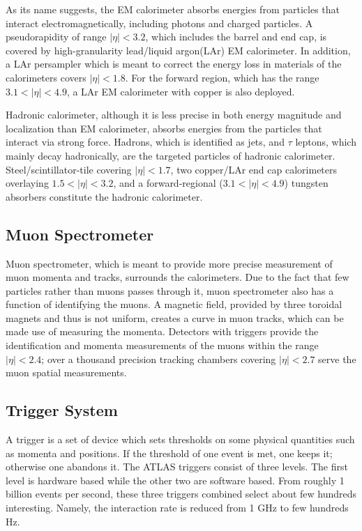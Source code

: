 \documentclass[class=NCU_thesis, crop=false]{standalone}
\begin{document}
		As its name suggests, the EM calorimeter absorbs energies from particles that interact electromagnetically, including photons and charged particles. A pseudorapidity of range $\lvert \eta \rvert < 3.2$, which includes the barrel and end cap, is covered by high-granularity lead/liquid argon(LAr) EM calorimeter. In addition, a LAr persampler which is meant to correct the energy loss in materials of the calorimeters covers $\lvert \eta \rvert < 1.8$. For the forward region, which has the range $3.1 < \lvert \eta \rvert < 4.9$, a LAr EM calorimeter with copper is also deployed.
		
		Hadronic calorimeter, although it is less precise in both energy magnitude and localization than EM calorimeter, absorbs energies from the particles that interact via strong force. Hadrons, which is identified as jets, and $\tau$ leptons, which mainly decay hadronically, are the targeted particles of hadronic calorimeter. Steel/scintillator-tile covering $\lvert \eta \rvert < 1.7$, two copper/LAr end cap calorimeters overlaying $1.5 < \lvert \eta \rvert < 3.2$, and a forward-regional ($3.1 < \lvert \eta \rvert < 4.9$) tungsten absorbers constitute the hadronic calorimeter.
	
	\subsection{Muon Spectrometer}
		Muon spectrometer, which is meant to provide more precise measurement of muon momenta and tracks, surrounds the calorimeters. Due to the fact that few particles rather than muons passes through it, muon spectrometer also has a function of identifying the muons. A magnetic field, provided by three toroidal magnets and thus is not uniform, creates a curve in muon tracks, which can be made use of measuring the momenta. Detectors with triggers provide the identification and momenta measurements of the muons within the range $\lvert \eta \rvert < 2.4$; over a thousand precision tracking chambers covering $\lvert \eta \rvert < 2.7$ serve the muon spatial measurements.
		
	\subsection{Trigger System}
		A trigger is a set of device which sets thresholds on some physical quantities such as momenta and positions. If the threshold of one event is met, one keeps it; otherwise one abandons it. The ATLAS triggers consist of three levels. The first level is hardware based while the other two are software based. From roughly 1 billion events per second, these three triggers combined select about few hundreds interesting. Namely, the interaction rate is reduced from 1 GHz to few hundreds Hz.
		
\end{document}
